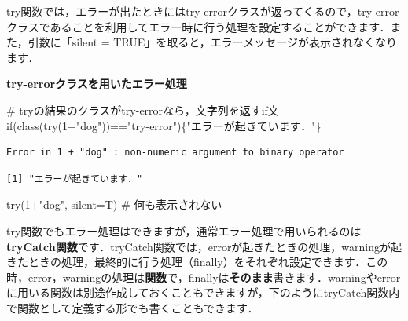 \documentclass[
  letterpaper,
  DIV=11,
  numbers=noendperiod]{scrreprt}
\newenvironment{Shaded}{\begin{snugshade}}{\end{snugshade}}
\newcommand{\AttributeTok}[1]{\textcolor[rgb]{0.40,0.45,0.13}{#1}}
\newcommand{\CommentTok}[1]{\textcolor[rgb]{0.37,0.37,0.37}{#1}}
\newcommand{\ControlFlowTok}[1]{\textcolor[rgb]{0.00,0.23,0.31}{#1}}
\newcommand{\DecValTok}[1]{\textcolor[rgb]{0.68,0.00,0.00}{#1}}
\newcommand{\FunctionTok}[1]{\textcolor[rgb]{0.28,0.35,0.67}{#1}}
\newcommand{\NormalTok}[1]{\textcolor[rgb]{0.00,0.23,0.31}{#1}}
\newcommand{\SpecialCharTok}[1]{\textcolor[rgb]{0.37,0.37,0.37}{#1}}
\newcommand{\StringTok}[1]{\textcolor[rgb]{0.13,0.47,0.30}{#1}}
\begin{document}
try関数では，エラーが出たときにはtry-errorクラスが返ってくるので，try-errorクラスであることを利用してエラー時に行う処理を設定することができます．また，引数に「silent
= TRUE」を取ると，エラーメッセージが表示されなくなります．

\textbf{try-errorクラスを用いたエラー処理}

\begin{Shaded}
\begin{Highlighting}[]
\CommentTok{\# tryの結果のクラスがtry{-}errorなら，文字列を返すif文}
\ControlFlowTok{if}\NormalTok{(}\FunctionTok{class}\NormalTok{(}\FunctionTok{try}\NormalTok{(}\DecValTok{1}\SpecialCharTok{+}\StringTok{"dog"}\NormalTok{))}\SpecialCharTok{==}\StringTok{"try{-}error"}\NormalTok{)\{}\StringTok{"エラーが起きています．"}\NormalTok{\}}
\end{Highlighting}
\end{Shaded}

\begin{verbatim}
Error in 1 + "dog" : non-numeric argument to binary operator
\end{verbatim}

\begin{verbatim}
[1] "エラーが起きています．"
\end{verbatim}

\begin{Shaded}
\begin{Highlighting}[]
\FunctionTok{try}\NormalTok{(}\DecValTok{1}\SpecialCharTok{+}\StringTok{"dog"}\NormalTok{, }\AttributeTok{silent=}\NormalTok{T) }\CommentTok{\# 何も表示されない}
\end{Highlighting}
\end{Shaded}

try関数でもエラー処理はできますが，通常エラー処理で用いられるのは\textbf{tryCatch関数}です．tryCatch関数では，errorが起きたときの処理，warningが起きたときの処理，最終的に行う処理（finally）をそれぞれ設定できます．この時，error，warningの処理は\textbf{関数}で，finallyは\textbf{そのまま}書きます．warningやerrorに用いる関数は別途作成しておくこともできますが，下のようにtryCatch関数内で関数として定義する形でも書くこともできます．

\textbf{}
\end{document}
